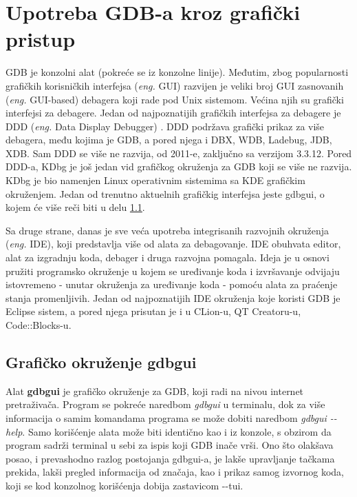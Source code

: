 \documentclass[a4paper]{article}
\begin{document}
\section{Upotreba GDB-a kroz grafički pristup}
\label{subsec:gui}

GDB je konzolni alat (pokreće se iz konzolne linije). Međutim, zbog popularnosti grafičkih korisničkih interfejsa
(\textit{eng.} GUI) razvijen je veliki broj GUI zasnovanih (\textit{eng.} GUI-based) debagera koji rade pod Unix sistemom. Većina njih su grafički interfejsi za debagere. Jedan od najpoznatijih grafičkih interfejsa za debagere je DDD (\textit{eng.} Data Display Debugger) \cite{art_debugging}. DDD podržava grafički prikaz za više debagera, među kojima je
GDB, a pored njega i DBX, WDB, Ladebug, JDB, XDB. Sam DDD se više ne razvija, od 2011-e, zaključno sa verzijom 3.3.12. \cite{GNUOrg}
Pored DDD-a, KDbg je još jedan vid grafičkog okruženja za GDB koji se više ne razvija. KDbg je bio namenjen
Linux operativnim sistemima sa KDE grafičkim okruženjem. Jedan od trenutno aktuelnih grafičkig interfejsa jeste
gdbgui, o kojem će više reči biti u delu \ref{subsec:gdbgui}.

Sa druge strane, danas je sve veća upotreba integrisanih razvojnih okruženja (\textit{eng.} IDE),
koji predstavlja više od alata za debagovanje. IDE obuhvata editor, alat za izgradnju koda, debager i druga 
razvojna pomagala. Ideja je u osnovi pružiti programsko okruženje u kojem se uređivanje koda i izvršavanje
odvijaju istovremeno - unutar okruženja za uređivanje koda - pomoću alata za praćenje stanja promenljivih\cite{computerworld}.
Jedan od najpoznatijih IDE okruženja koje koristi GDB je Eclipse sistem,
a pored njega prisutan je i u CLion-u, QT Creatoru-u, Code::Blocks-u\cite{sourceware}.

\subsection{Grafičko okruženje gdbgui}
\label{subsec:gdbgui}

Alat \textbf{gdbgui} je grafičko okruženje za GDB, koji radi na nivou internet pretraživača.
Program se pokreće naredbom \textit{gdbgui} u terminalu, dok za više informacija o samim komandama
programa se može dobiti naredbom \textit{gdbgui -\phantom{}-help}\cite{gdbgui}. Samo korišćenje alata može biti
identično kao i iz konzole, s obzirom da program sadrži terminal u sebi za ispis koji GDB inače vrši. Ono 
što olakšava posao, i prevashodno razlog postojanja gdbgui-a, je lakše upravljanje tačkama prekida,
lakši pregled informacija od značaja, kao i prikaz samog izvornog koda, koji se kod konzolnog korišćenja 
dobija zastavicom -\phantom{}-tui.
\end{document}
